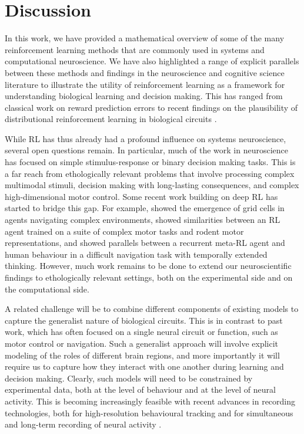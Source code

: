 \section{Discussion}
\label{sec:discussion}

In this work, we have provided a mathematical overview of some of the many reinforcement learning methods that are commonly used in systems and computational neuroscience.
We have also highlighted a range of explicit parallels between these methods and findings in the neuroscience and cognitive science literature to illustrate the utility of reinforcement learning as a framework for understanding biological learning and decision making.
This has ranged from classical work on reward prediction errors \citep{schultz1997neural} to recent findings on the plausibility of distributional reinforcement learning in biological circuits \citep{dabney2020distributional}.

While RL has thus already had a profound influence on systems neuroscience, several open questions remain.
In particular, much of the work in neuroscience has focused on simple stimulus-response or binary decision making tasks.
This is a far reach from ethologically relevant problems that involve processing complex multimodal stimuli, decision making with long-lasting consequences, and complex high-dimensional motor control.
Some recent work building on deep RL has started to bridge this gap.
For example, \citet{banino2018vector} showed the emergence of grid cells in agents navigating complex environments, \citet{merel2019deep} showed similarities between an RL agent trained on a suite of complex motor tasks and rodent motor representations, and \citet{jensen2023recurrent} showed parallels between a recurrent meta-RL agent and human behaviour in a difficult navigation task with temporally extended thinking.
However, much work remains to be done to extend our neuroscientific findings to ethologically relevant settings, both on the experimental side and on the computational side.

A related challenge will be to combine different components of existing models to capture the generalist nature of biological circuits.
This is in contrast to past work, which has often focused on a single neural circuit or function, such as motor control or navigation.
Such a generalist approach will involve explicit modeling of the roles of different brain regions, and more importantly it will require us to capture how they interact with one another during learning and decision making.
Clearly, such models will need to be constrained by experimental data, both at the level of behaviour and at the level of neural activity.
This is becoming increasingly feasible with recent advances in recording technologies, both for high-resolution behavioural tracking \citep{mathis2018deeplabcut,dunn2021geometric} and for simultaneous and long-term recording of neural activity \citep{steinmetz2021neuropixels, pachitariu2016suite2p, dhawale2017automated}.

